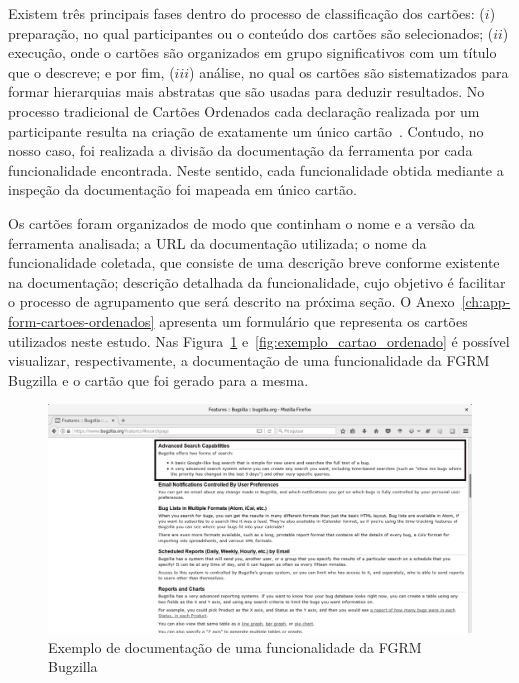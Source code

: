 Existem três principais fases dentro do processo de classificação dos cartões:
($i$) preparação, no qual participantes ou o conteúdo dos cartões são selecionados;
($ii$) execução, onde o cartões são organizados em grupo significativos com um
título que o descreve; e por fim, ($iii$) análise, no qual os cartões são
sistematizados para formar hierarquias mais abstratas que são usadas para
deduzir resultados. No processo tradicional de Cartões Ordenados cada declaração
realizada por um participante resulta na criação de exatamente um único
cartão~\cite{just2008towards}. Contudo, no nosso caso, foi realizada a divisão
da documentação da ferramenta por cada funcionalidade encontrada. Neste sentido,
cada funcionalidade obtida mediante a inspeção da documentação foi mapeada em
único cartão.

Os cartões foram organizados de modo que continham o nome e a versão da
ferramenta analisada; a URL da documentação utilizada; o nome da funcionalidade
coletada, que consiste de uma descrição breve conforme existente na
documentação; descrição detalhada da funcionalidade, cujo objetivo é facilitar o
processo de agrupamento que será descrito na próxima seção. O
Anexo~\ref{ch:app-form-cartoes-ordenados} apresenta um formulário que representa
os cartões utilizados neste estudo. Nas Figura~\ref{fig:documentacao_bugzilla}
e~\ref{fig:exemplo_cartao_ordenado} é possível visualizar, respectivamente, a
documentação de uma funcionalidade da FGRM Bugzilla e o cartão que foi gerado
para a mesma.

\begin{figure}[htpb]
	\centering
	\includegraphics[width=0.8\linewidth]{./chapter-estudo-funcionalidades-fgrm/img/documentacao_bugzilla.png}
	\caption{Exemplo de documentação de uma funcionalidade da FGRM Bugzilla}
\label{fig:documentacao_bugzilla}
\end{figure}

